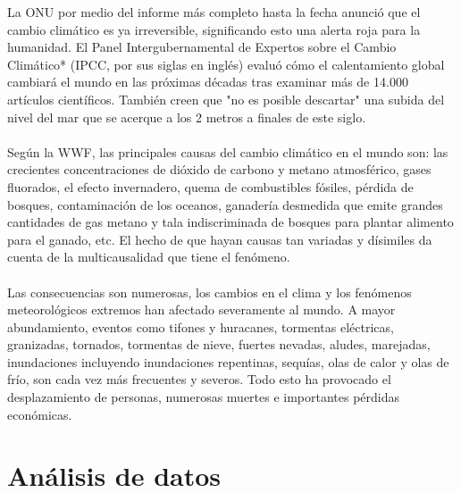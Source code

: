 \documentclass[12pt]{article}
\begin{document}
La ONU por medio del informe más completo hasta la fecha anunció que el cambio climático es ya irreversible, significando esto una alerta roja para la humanidad. El Panel Intergubernamental de Expertos sobre el Cambio Climático* (IPCC, por sus siglas en inglés) evaluó cómo el calentamiento global cambiará el mundo en las próximas décadas tras examinar más de 14.000 artículos científicos.  También creen que "no es posible descartar" una subida del nivel del mar que se acerque a los 2 metros a finales de este siglo.\\ \\
Según la WWF, las principales causas del cambio climático en el mundo son: las crecientes concentraciones de dióxido de carbono y metano atmosférico, gases fluorados, el efecto invernadero, quema de combustibles fósiles, pérdida de bosques, contaminación de los oceanos, ganadería desmedida que emite grandes cantidades de gas metano y tala indiscriminada de bosques para plantar alimento para el ganado, etc. El hecho de que hayan causas tan variadas y dísimiles da cuenta de la multicausalidad que tiene el fenómeno.\\ \\
Las consecuencias son numerosas, los cambios en el clima y los fenómenos meteorológicos extremos han afectado severamente al mundo. A mayor abundamiento, eventos como tifones y huracanes, tormentas eléctricas, granizadas, tornados, tormentas de nieve, fuertes nevadas, aludes, marejadas, inundaciones incluyendo inundaciones repentinas, sequías, olas de calor y olas de frío, son cada vez más frecuentes y severos. Todo esto ha provocado el desplazamiento de personas, numerosas muertes e importantes pérdidas económicas.

\section{Análisis de datos}
\end{document}
